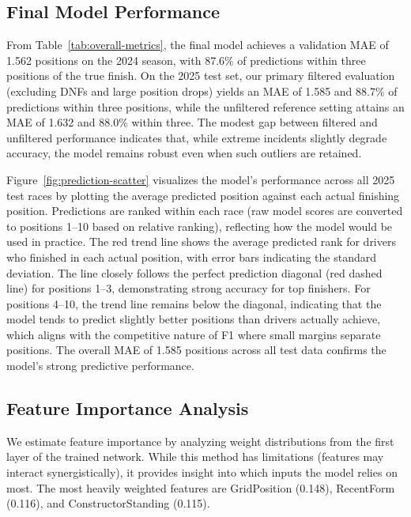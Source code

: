 \documentclass{article}
\begin{document}
\subsection{Final Model Performance}

From Table~\ref{tab:overall-metrics}, the final model achieves a validation MAE of 1.562 positions on the 2024 season, with 87.6\% of predictions within three positions of the true finish. On the 2025 test set, our primary filtered evaluation (excluding DNFs and large position drops) yields an MAE of 1.585 and 88.7\% of predictions within three positions, while the unfiltered reference setting attains an MAE of 1.632 and 88.0\% within three. The modest gap between filtered and unfiltered performance indicates that, while extreme incidents slightly degrade accuracy, the model remains robust even when such outliers are retained.

Figure~\ref{fig:prediction-scatter} visualizes the model's performance across all 2025 test races by plotting the average predicted position against each actual finishing position. Predictions are ranked within each race (raw model scores are converted to positions 1--10 based on relative ranking), reflecting how the model would be used in practice. The red trend line shows the average predicted rank for drivers who finished in each actual position, with error bars indicating the standard deviation. The line closely follows the perfect prediction diagonal (red dashed line) for positions 1--3, demonstrating strong accuracy for top finishers. For positions 4--10, the trend line remains below the diagonal, indicating that the model tends to predict slightly better positions than drivers actually achieve, which aligns with the competitive nature of F1 where small margins separate positions. The overall MAE of 1.585 positions across all test data confirms the model's strong predictive performance.


\subsection{Feature Importance Analysis}

We estimate feature importance by analyzing weight distributions from the first layer of the trained network. While this method has limitations (features may interact synergistically), it provides insight into which inputs the model relies on most. The most heavily weighted features are GridPosition (0.148), RecentForm (0.116), and ConstructorStanding (0.115).
\end{document}

